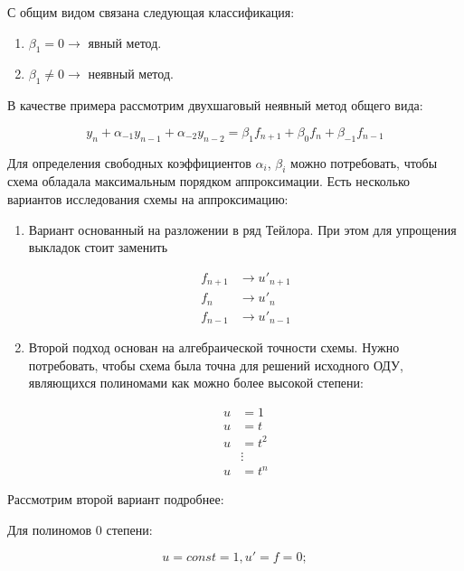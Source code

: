 \documentclass[10pt,a4paper]{article}
\begin{document}
		С общим видом связана следующая классификация:
		
		\begin{enumerate}
			\item $\beta_{1} = 0 \rightarrow$ явный метод.
			\item $\beta_{1} \neq 0 \rightarrow$ неявный метод.
		\end{enumerate}
		
		В качестве примера рассмотрим двухшаговый неявный метод общего вида:
		
		\begin{equation}
			y_{n} + \alpha_{-1}y_{n - 1} + \alpha_{-2}y_{n - 2} = 
			\beta_{1}f_{n + 1} + \beta_{0}f_{n} + \beta_{-1}f_{n - 1}
		\end{equation}
		
		
		Для определения свободных коэффициентов $\alpha_i$, $\beta_i$ можно 
		потребовать,
		чтобы схема обладала максимальным порядком аппроксимации.
		Есть несколько вариантов исследования схемы на аппроксимацию:
		
		\begin{enumerate}
			\item Вариант основанный на разложении в ряд Тейлора. При этом для 
			упрощения выкладок стоит заменить 
			
			\begin{align}
				f_{n + 1} &\rightarrow u'_{n + 1}\\
				f_{n} &\rightarrow u'_{n} \\
				f_{n - 1} &\rightarrow u'_{n - 1}
			\end{align}
			
			\item Второй подход основан на алгебраической точности схемы. Нужно 
			потребовать, чтобы схема была точна для решений исходного ОДУ, 
			являющихся полиномами как можно более высокой степени:
			
			\begin{align}
				u &= 1 \\
				u &= t \\
				u &= t^{2}\\
				&\vdots\\
				u &= t^{n}
			\end{align}
		\end{enumerate}
		
		Рассмотрим второй вариант подробнее:

		Для полиномов 0 степени:		
		
		\begin{equation}
			u = const = 1, u' = f = 0;
		\end{equation}
		
\end{document}

